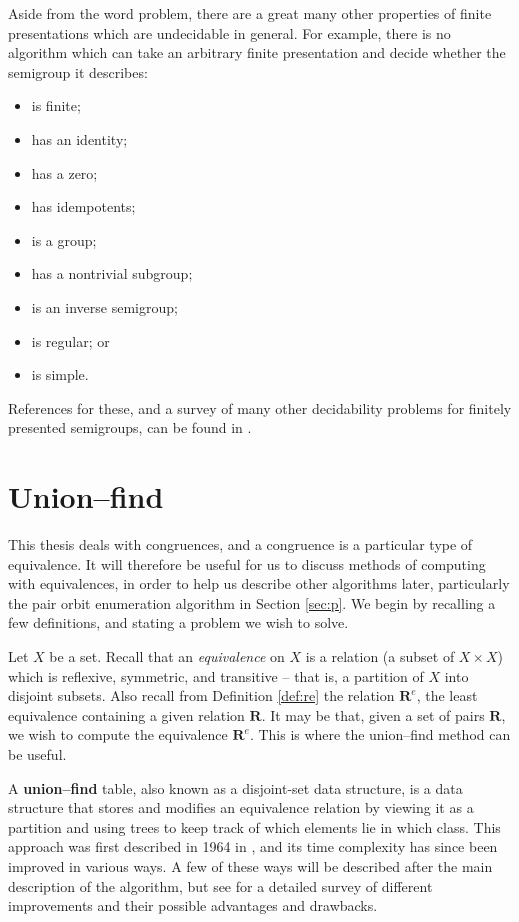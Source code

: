 Aside from the word problem, there are a great many other properties of finite
presentations which are undecidable in general.  For example, there is no
algorithm which can take an arbitrary finite presentation and decide whether the
semigroup it describes:
\begin{itemize}
\item is finite;
\item has an identity;
\item has a zero;
\item has idempotents;
\item is a group;
\item has a nontrivial subgroup;
\item is an inverse semigroup;
\item is regular; or
\item is simple.
\end{itemize}
References for these, and a survey of many other decidability problems for
finitely presented semigroups, can be found in \cite{cain_maltcev}.

\section{Union--find}
\label{sec:union-find}
This thesis deals with congruences, and a congruence is a particular type of
equivalence.  It will therefore be useful for us to discuss methods of computing
with equivalences, in order to help us describe other algorithms later,
particularly the pair orbit enumeration algorithm in Section \ref{sec:p}.  We
begin by recalling a few definitions, and stating a problem we wish to solve.

Let $X$ be a set.  Recall that an \textit{equivalence} on $X$ is a relation (a
subset of $X \times X$) which is reflexive, symmetric, and transitive -- that is,
a partition of $X$ into disjoint subsets.  Also recall from Definition
\ref{def:re} the relation $\mathbf{R}^e$, the least equivalence containing a
given relation $\mathbf{R}$.  It may be that, given a set of pairs $\mathbf{R}$,
we wish to compute the equivalence $\mathbf{R}^e$.  This is where the union--find
method can be useful.

A \textbf{union--find} table, also known as a disjoint-set data structure, is a
data structure that stores and modifies an equivalence relation by viewing it as
a partition and using trees to keep track of which elements lie in which class.
This approach was first described in 1964 in \cite{galler_1964}, and its time
complexity has since been improved in various ways.  A few of these ways will be
described after the main description of the algorithm, but see \cite{galil_1991}
for a detailed survey of different improvements and their possible advantages
and drawbacks.

